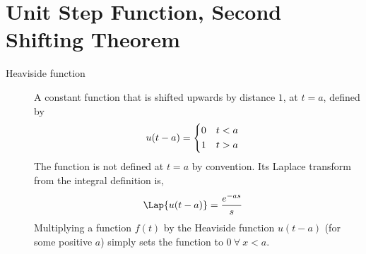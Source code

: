 \section{Unit Step Function, Second Shifting Theorem}
\begin{description}
    \item[Heaviside function] A constant function that is shifted upwards by distance
        $ 1 $, at $ t = a $, defined by
        \begin{align}
            u(t-a) & = \begin{dcases}
                           0 & t < a \\
                           1 & t > a
                       \end{dcases}
        \end{align}
        The function is not defined at $ t = a $ by convention. Its Laplace transform from
        the integral definition is,
        \begin{align}
            \Lap\{u(t-a)\} & = \frac{e^{-as}}{s}
        \end{align}
        Multiplying a function $ f(t) $ by the Heaviside function $ u(t-a) $ (for some
        positive $ a $) simply sets the function to $ 0\ \forall\ x < a $.


\end{description}
